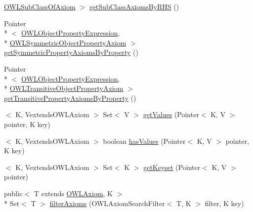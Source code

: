 \begin{DoxyCompactItemize}
\hyperlink{interfaceorg_1_1semanticweb_1_1owlapi_1_1model_1_1_o_w_l_sub_class_of_axiom}{O\-W\-L\-Sub\-Class\-Of\-Axiom} $>$ \hyperlink{interfaceuk_1_1ac_1_1manchester_1_1cs_1_1owl_1_1owlapi_1_1_internals_ab1cbde625551f8ec2b2f710d057d9dc5}{get\-Sub\-Class\-Axioms\-By\-R\-H\-S} ()
\item 
Pointer\\*
$<$ \hyperlink{interfaceorg_1_1semanticweb_1_1owlapi_1_1model_1_1_o_w_l_object_property_expression}{O\-W\-L\-Object\-Property\-Expression}, \\*
\hyperlink{interfaceorg_1_1semanticweb_1_1owlapi_1_1model_1_1_o_w_l_symmetric_object_property_axiom}{O\-W\-L\-Symmetric\-Object\-Property\-Axiom} $>$ \hyperlink{interfaceuk_1_1ac_1_1manchester_1_1cs_1_1owl_1_1owlapi_1_1_internals_a91067e7c7aef6a533399dc6aa28a1b95}{get\-Symmetric\-Property\-Axioms\-By\-Property} ()
\item 
Pointer\\*
$<$ \hyperlink{interfaceorg_1_1semanticweb_1_1owlapi_1_1model_1_1_o_w_l_object_property_expression}{O\-W\-L\-Object\-Property\-Expression}, \\*
\hyperlink{interfaceorg_1_1semanticweb_1_1owlapi_1_1model_1_1_o_w_l_transitive_object_property_axiom}{O\-W\-L\-Transitive\-Object\-Property\-Axiom} $>$ \hyperlink{interfaceuk_1_1ac_1_1manchester_1_1cs_1_1owl_1_1owlapi_1_1_internals_a61da8a81982d8f9df698a406177a140a}{get\-Transitive\-Property\-Axioms\-By\-Property} ()
\item 
$<$ K, Vextends\-O\-W\-L\-Axiom $>$ Set$<$ V $>$ \hyperlink{interfaceuk_1_1ac_1_1manchester_1_1cs_1_1owl_1_1owlapi_1_1_internals_adb8a1cbb5c1c50205af5e98b1d44893e}{get\-Values} (Pointer$<$ K, V $>$ pointer, K key)
\item 
$<$ K, Vextends\-O\-W\-L\-Axiom $>$ boolean \hyperlink{interfaceuk_1_1ac_1_1manchester_1_1cs_1_1owl_1_1owlapi_1_1_internals_a2e3014c32d854035da0ff2c2695a9af1}{has\-Values} (Pointer$<$ K, V $>$ pointer, K key)
\item 
$<$ K, Vextends\-O\-W\-L\-Axiom $>$ Set$<$ K $>$ \hyperlink{interfaceuk_1_1ac_1_1manchester_1_1cs_1_1owl_1_1owlapi_1_1_internals_a349082e03ef4fbee752949861f986fdb}{get\-Keyset} (Pointer$<$ K, V $>$ pointer)
\item 
public$<$ T extends \hyperlink{interfaceorg_1_1semanticweb_1_1owlapi_1_1model_1_1_o_w_l_axiom}{O\-W\-L\-Axiom}, K $>$\\*
 Set$<$ T $>$ \hyperlink{interfaceuk_1_1ac_1_1manchester_1_1cs_1_1owl_1_1owlapi_1_1_internals_af3c8cd6ed8f8d7dc9007a6a1258d50bb}{filter\-Axioms} (O\-W\-L\-Axiom\-Search\-Filter$<$ T, K $>$ filter, K key)

\end{DoxyCompactItemize}
